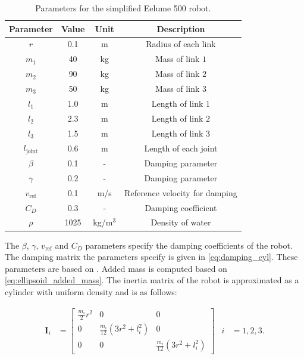 \begin{table}[h]
    \centering
    \begin{tabular}{|c|c|c|c|}
        \hline
        Parameter & Value & Unit & Description \\ \hline
        $r$ & 0.1 & m & Radius of each link \\
        $m_1$ & 40 & kg & Mass of link $1$ \\
        $m_2$ & 90 & kg & Mass of link $2$ \\
        $m_3$ & 50 & kg & Mass of link $3$ \\
        $l_1$ & 1.0 & m & Length of link $1$ \\
        $l_2$ & 2.3 & m & Length of link $2$ \\
        $l_3$ & 1.5 & m & Length of link $3$ \\
        $l_{\mathrm{joint}}$ & 0.6 & m & Length of each joint \\
        $\beta$ & 0.1 & - & Damping parameter \\
        $\gamma$ & 0.2 & - & Damping parameter \\
        $v_{\mathrm{ref}}$ & 0.1 & m/s & Reference velocity for damping \\
        $C_D$ & 0.3 & - & Damping coefficient \\
        $\rho$ & 1025 & kg/m$^3$ & Density of water \\
        \hline
    \end{tabular}
    \caption{Parameters for the simplified Eelume 500 robot.}
    \label{tab:robot}
\end{table}

The $\beta$, $\gamma$, $v_{\mathrm{ref}}$ and $C_D$ parameters specify the damping
coefficients of the robot. The damping matrix the parameters specify is given in
\autoref{eq:damping_cyl}. These parameters are based on \cite{bendik}. Added mass
is computed based on \autoref{eq:ellipsoid_added_mass}.
The inertia matrix of the robot is approximated as a
cylinder with uniform density and is as follows:

\begin{align}
    \bm{I}_i &=
    \begin{bmatrix}
        \frac{m_i}{2} r^2 & 0 & 0 \\
        0 & \frac{m_i}{12} (3r^2 + l_i^2) & 0 \\
        0 & 0 & \frac{m_i}{12} (3r^2 + l_i^2)
    \end{bmatrix} &
    i &= 1, 2, 3.
\end{align}

